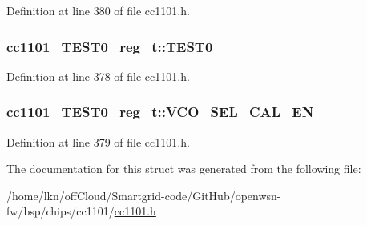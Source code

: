 Definition at line 380 of file cc1101.\+h.

\subsubsection[{\texorpdfstring{T\+E\+S\+T0\+\_\+2}{TEST0_2}}]{ cc1101\+\_\+\+T\+E\+S\+T0\+\_\+reg\+\_\+t\+::\+T\+E\+S\+T0\+\_}\hypertarget{structcc1101___t_e_s_t0__reg__t_ac37d759eb50d33b3e6d705a09f9f34d6}{}\label{structcc1101___t_e_s_t0__reg__t_ac37d759eb50d33b3e6d705a09f9f34d6}


Definition at line 378 of file cc1101.\+h.

\subsubsection[{\texorpdfstring{V\+C\+O\+\_\+\+S\+E\+L\+\_\+\+C\+A\+L\+\_\+\+EN}{VCO_SEL_CAL_EN}}]{ cc1101\+\_\+\+T\+E\+S\+T0\+\_\+reg\+\_\+t\+::\+V\+C\+O\+\_\+\+S\+E\+L\+\_\+\+C\+A\+L\+\_\+\+EN}\hypertarget{structcc1101___t_e_s_t0__reg__t_ab0aeb80fe05315ca78a519717dd8d5a8}{}\label{structcc1101___t_e_s_t0__reg__t_ab0aeb80fe05315ca78a519717dd8d5a8}


Definition at line 379 of file cc1101.\+h.



The documentation for this struct was generated from the following file\+:\begin{DoxyCompactItemize}
\item 
/home/lkn/off\+Cloud/\+Smartgrid-\/code/\+Git\+Hub/openwsn-\/fw/bsp/chips/cc1101/\hyperlink{cc1101_8h}{cc1101.\+h}\end{DoxyCompactItemize}
